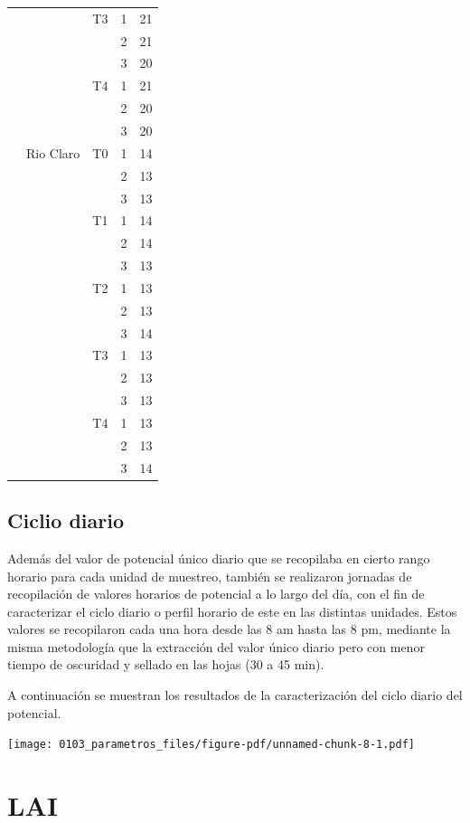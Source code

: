 \documentclass[
  letterpaper,
  DIV=11,
  numbers=noendperiod]{scrreprt}
\begin{document}
\begin{longtable}[]{@{}llllr@{}}
& & T3 & 1 & 21 \\
& & & 2 & 21 \\
& & & 3 & 20 \\
& & T4 & 1 & 21 \\
& & & 2 & 20 \\
& & & 3 & 20 \\
& Rio Claro & T0 & 1 & 14 \\
& & & 2 & 13 \\
& & & 3 & 13 \\
& & T1 & 1 & 14 \\
& & & 2 & 14 \\
& & & 3 & 13 \\
& & T2 & 1 & 13 \\
& & & 2 & 13 \\
& & & 3 & 14 \\
& & T3 & 1 & 13 \\
& & & 2 & 13 \\
& & & 3 & 13 \\
& & T4 & 1 & 13 \\
& & & 2 & 13 \\
& & & 3 & 14 \\
\end{longtable}

\subsection{Ciclio diario}\label{ciclio-diario}

Además del valor de potencial único diario que se recopilaba en cierto
rango horario para cada unidad de muestreo, también se realizaron
jornadas de recopilación de valores horarios de potencial a lo largo del
día, con el fin de caracterizar el ciclo diario o perfil horario de este
en las distintas unidades. Estos valores se recopilaron cada una hora
desde las 8 am hasta las 8 pm, mediante la misma metodología que la
extracción del valor único diario pero con menor tiempo de oscuridad y
sellado en las hojas (30 a 45 min).

A continuación se muestran los resultados de la caracterización del
ciclo diario del potencial.

\begin{center}
\texttt{[image: 0103\_parametros\_files/figure-pdf/unnamed-chunk-8-1.pdf]}
\end{center}

\section{LAI}\label{lai}
\end{document}
